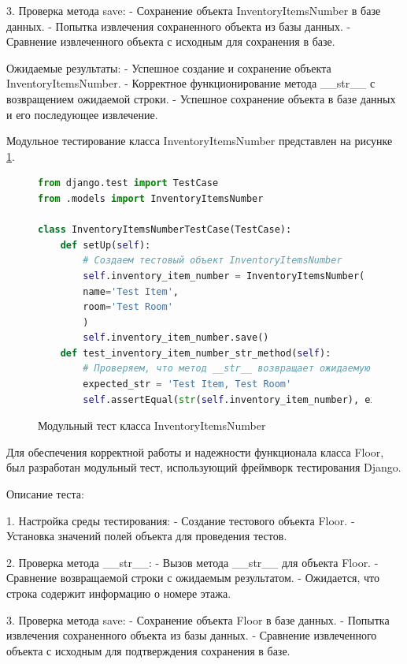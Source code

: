 3. Проверка метода save:
- Сохранение объекта InventoryItemsNumber в базе данных.
- Попытка извлечения сохраненного объекта из базы данных.
- Сравнение извлеченного объекта с исходным для сохранения в базе.

Ожидаемые результаты:
- Успешное создание и сохранение объекта InventoryItemsNumber.
- Корректное функционирование метода \_\_str\_\_ с возвращением ожидаемой строки.
- Успешное сохранение объекта в базе данных и его последующее извлечение.

Модульное тестирование класса InventoryItemsNumber представлен на рисунке \ref{InventoryItemsNumber:image}.

\begin{figure}[ht]
\begin{lstlisting}[language=Python]		
from django.test import TestCase
from .models import InventoryItemsNumber 

class InventoryItemsNumberTestCase(TestCase):
	def setUp(self):
		# Создаем тестовый объект InventoryItemsNumber
		self.inventory_item_number = InventoryItemsNumber(
		name='Test Item',
		room='Test Room'
		)
		self.inventory_item_number.save()
	def test_inventory_item_number_str_method(self):
		# Проверяем, что метод __str__ возвращает ожидаемую строку
		expected_str = 'Test Item, Test Room'
		self.assertEqual(str(self.inventory_item_number), expected_str)

\end{lstlisting}  
\caption{Модульный тест класса InventoryItemsNumber}
\label{InventoryItemsNumber:image}
\end{figure}

\newpage

Для обеспечения корректной работы и надежности функционала класса Floor, был разработан модульный тест, использующий фреймворк тестирования Django.

Описание теста:

1. Настройка среды тестирования:
- Создание тестового объекта Floor.
- Установка значений полей объекта для проведения тестов.

2. Проверка метода \_\_str\_\_:
- Вызов метода \_\_str\_\_ для объекта Floor.
- Сравнение возвращаемой строки с ожидаемым результатом.
- Ожидается, что строка содержит информацию о номере этажа.

3. Проверка метода save:
- Сохранение объекта Floor в базе данных.
- Попытка извлечения сохраненного объекта из базы данных.
- Сравнение извлеченного объекта с исходным для подтверждения сохранения в базе.

